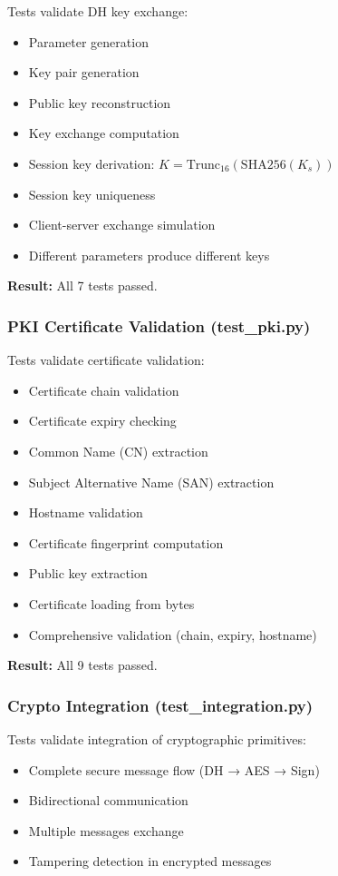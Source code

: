 \documentclass[runningheads]{llncs}
\begin{document}
Tests validate DH key exchange:
\begin{itemize}
    \item Parameter generation
    \item Key pair generation
    \item Public key reconstruction
    \item Key exchange computation
    \item Session key derivation: $K = \text{Trunc}_{16}(\text{SHA256}(K_s))$
    \item Session key uniqueness
    \item Client-server exchange simulation
    \item Different parameters produce different keys
\end{itemize}

\textbf{Result:} All 7 tests passed.

\subsubsection{PKI Certificate Validation (test\_pki.py)}

Tests validate certificate validation:
\begin{itemize}
    \item Certificate chain validation
    \item Certificate expiry checking
    \item Common Name (CN) extraction
    \item Subject Alternative Name (SAN) extraction
    \item Hostname validation
    \item Certificate fingerprint computation
    \item Public key extraction
    \item Certificate loading from bytes
    \item Comprehensive validation (chain, expiry, hostname)
\end{itemize}

\textbf{Result:} All 9 tests passed.

\subsubsection{Crypto Integration (test\_integration.py)}

Tests validate integration of cryptographic primitives:
\begin{itemize}
    \item Complete secure message flow (DH → AES → Sign)
    \item Bidirectional communication
    \item Multiple messages exchange
    \item Tampering detection in encrypted messages
\end{itemize}
\end{document}
